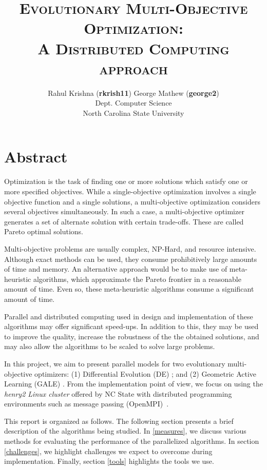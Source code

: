 \documentclass[10pt]{article}
\begin{document}
\title{\textsc{Evolutionary Multi-Objective Optimization:\\ A Distributed Computing approach}}
\author{Rahul Krishna (\textbf{rkrish11}) \hspace{0.75cm} George Mathew (\textbf{george2}) \\Dept. Computer Science\\North Carolina State University}
\date{}
\maketitle
\section*{Abstract}

Optimization is the task of finding one or more solutions which satisfy one or more specified objectives. While a single-objective optimization involves a single objective function and a single solutions, a multi-objective optimization considers several objectives simultaneously. In such a  case, a multi-objective optimizer generates a set of alternate solution with certain trade-offs. These are called Pareto optimal solutions.

Multi-objective problems are usually complex, NP-Hard, and resource intensive. Although exact methods can be used, they consume prohibitively large amounts of time and memory. An alternative approach would be to make use of meta-heuristic algorithms, which approximate the Pareto frontier in a reasonable amount of time. Even so, these meta-heuristic algorithms consume a significant amount of time. 

Parallel and distributed computing used in design and implementation of these algorithms may offer significant speed-ups. In addition to this, they may be used to improve the quality, increase the robustness of the the obtained solutions, and may also allow the algorithms to be scaled to solve large problems. 

In this project, we aim to present parallel models for two evolutionary multi-objective optimizers: (1) Differential Evolution (DE) \cite{storn97}; and (2) Geometric Active Learning (GALE) \cite{krall15}. From the implementation point of view, we focus on using the \textit{henry2 Linux cluster} offered by NC State with distributed programming environments such as message passing (OpenMPI)~\cite{openMPI04}.

This report is organized as follows. The following section presents a brief description of the algorithms being studied. In \textsection\ref{measures}, we discuss various methods for evaluating the performance of the parallelized algorithms. In section \textsection\ref{challenges}, we highlight challenges we expect to overcome during implementation. Finally, section \textsection\ref{tools} highlights the tools we use.
\end{document}

